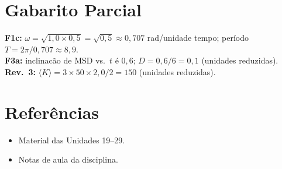 \documentclass[12pt,a4paper]{article}
\begin{document}
\section*{Gabarito Parcial}
\textbf{F1c:} $\omega = \sqrt{1{,}0\times0{,}5} = \sqrt{0{,}5} \approx 0{,}707$ rad/unidade tempo; per\'iodo $T = 2\pi/0{,}707 \approx 8{,}9$.\\
\textbf{F3a:} inclinac\~ao de MSD vs.\ $t$ \'e $0{,}6$; $D = 0{,}6/6 = 0{,}1$ (unidades reduzidas).\\
\textbf{Rev.\ 3:} $\langle K\rangle = 3\times50\times2{,}0/2 = 150$ (unidades reduzidas).

\section*{Refer\^encias}
\begin{itemize}
  \item Material das Unidades 19--29.
  \item Notas de aula da disciplina.
\end{itemize}
\end{document}

